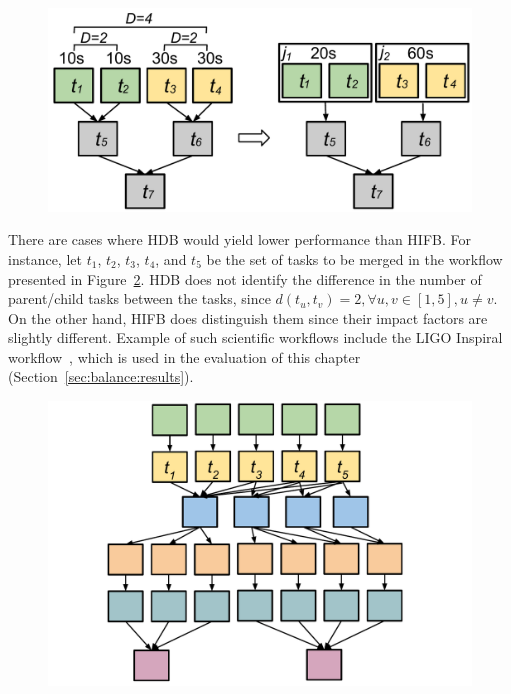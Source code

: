 \begin{figure}[!htb]
	\centering
	\includegraphics[width=0.7\linewidth]{figures/balance/figure10.pdf}
	\label{fig:imbalance_hdb}
\end{figure}

There are cases where HDB would yield lower performance than HIFB. For instance, let $t_1$, $t_2$, $t_3$, $t_4$, and $t_5$ be the set of tasks to be merged in the workflow presented in Figure~\ref{fig:imbalance_hifb_hdb}. HDB does not identify the difference in the number of parent/child tasks between the tasks, since $d(t_u,t_v) = 2, \forall u,v \in [1,5], u \neq v$. On the other hand, HIFB does distinguish them since their impact factors are slightly different. Example of such scientific workflows include the LIGO Inspiral workflow~\cite{LIGO}, which is used in the evaluation of this chapter (Section~\ref{sec:balance:results}).

\begin{figure}[!htb]
	\centering
	\includegraphics[width=0.75\linewidth]{figures/balance/figure11.pdf}
	\label{fig:imbalance_hifb_hdb}
\end{figure}


